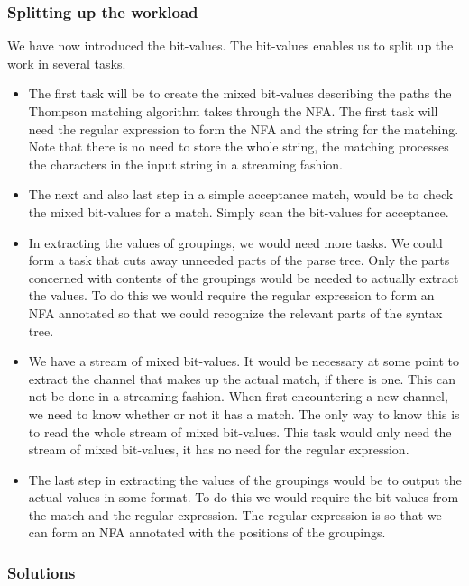 \subsubsection{Splitting up the workload}
We have now introduced the bit-values. The bit-values enables us to
split up the work in several tasks. 
\begin{itemize}
\item The first task will be to create the mixed bit-values describing
  the paths the Thompson matching algorithm takes through the NFA. The
  first task will need the regular expression to form the NFA and the
  string for the matching. Note that there is no need to store the
  whole string, the matching processes the characters in the input
  string in a streaming fashion.
\item The next and also last step in a simple acceptance match, would
  be to check the mixed bit-values for a match. Simply scan the
  bit-values for acceptance. 
\item In extracting the values of groupings, we would need more
  tasks. We could form a task that cuts away unneeded parts of the
  parse tree. Only the parts concerned with contents of the groupings
  would be needed to actually extract the values. To do this we would
  require the regular expression to form an NFA annotated so that we
  could recognize the relevant parts of the syntax tree.
\item We have a stream of mixed bit-values. It would be necessary at
  some point to extract the channel that makes up the actual match, if
  there is one. This can not be done in a streaming fashion. When
  first encountering a new channel, we need to know whether or not it
  has a match. The only way to know this is to read the whole stream
  of mixed bit-values. This task would only need the stream of mixed
  bit-values, it has no need for the regular expression.
\item The last step in extracting the values of the groupings would be
  to output the actual values in some format. To do this we would
  require the bit-values from the match and the regular
  expression. The regular expression is so that we can form an NFA
  annotated with the positions of the groupings. 
\end{itemize}


\subsubsection{Solutions}

